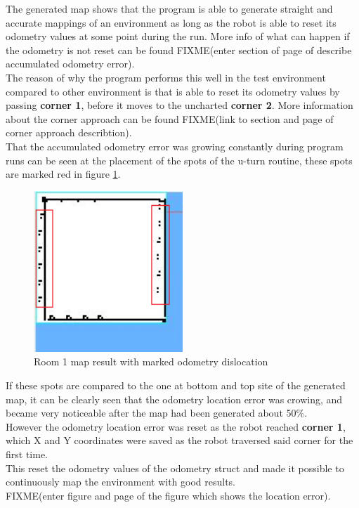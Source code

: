 The generated map shows that the program is able to generate straight and accurate mappings of an environment as long as the robot is able to reset its odometry values at some point during the run. More info of what can happen if the odometry is not reset can be found FIXME(enter section of page of describe accumulated odometry error). \\
The reason of why the program performs this well in the test environment compared to other environment is that is able to reset its odometry values by passing \textbf{corner 1}, before it moves to the uncharted \textbf{corner 2}. More information about the corner approach can be found FIXME(link to section and page of corner approach describtion). \\
That the accumulated odometry error was growing constantly during program runs can be seen at the placement of the spots of the u-turn routine, these spots are marked red in figure \ref{room1_empty_marked}.

\begin{figure}[h]
\centering
\includegraphics[width = 0.5\textwidth]{../../figures/room1_result_marked.png} 
\caption{Room 1 map result with marked odometry dislocation}
\label{room1_empty_marked}
\end{figure}

If these spots are compared to the one at bottom and top site of the generated map, it can be clearly seen that the odometry location error was crowing, and became very noticeable after the map had been generated about 50\%.\\[3ex]

However the odometry location error was reset as the robot reached \textbf{corner 1}, which X and Y coordinates were saved as the robot traversed said corner for the first time. \\
This reset the odometry values of the odometry struct and made it possible to continuously map the environment with good results. \\ 
FIXME(enter figure and page of the figure which shows  the location error).\\[3ex]

